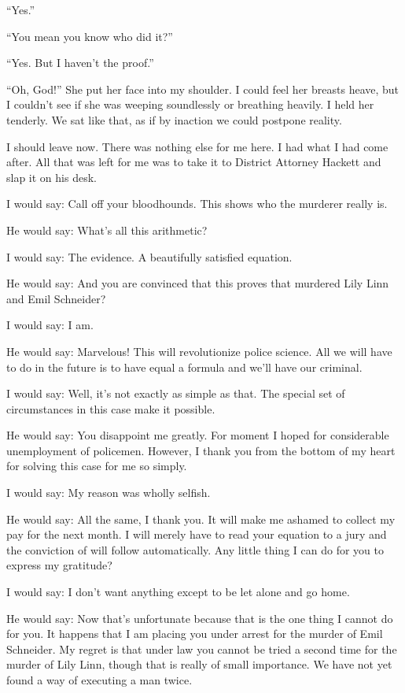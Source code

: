 \documentclass{novel}
\begin{document}
“Yes.”

“You mean you know who did it?”

“Yes. But I haven’t the proof.”

“Oh, God!” She put her face into my shoulder. I could feel her breasts heave, but I couldn’t see if she was weeping soundlessly or breathing heavily. I held her tenderly. We sat like that, as if by inaction we could postpone reality.

\scenestars

I should leave now. There was nothing else for me here. I had what I had come after. All that was left for me was to take it to District Attorney Hackett and slap it on his desk.

I would say: Call off your bloodhounds. This shows who the murderer really is.

He would say: What’s all this arithmetic?

I would say: The evidence. A beautifully satisfied equation.

He would say: And you are convinced that this proves that  murdered Lily Linn and Emil Schneider?

I would say: I am.

He would say: Marvelous! This will revolutionize police science. All we will have to do in the future is to have  equal a formula and we’ll have our criminal.

I would say: Well, it’s not exactly as simple as that. The special set of circumstances in this case make it possible.

He would say: You disappoint me greatly. For moment I hoped for considerable unemployment of policemen. However, I thank you from the bottom of my heart for solving this case for me so simply.

I would say: My reason was wholly selfish.

He would say: All the same, I thank you. It will make me ashamed to collect my pay for the next month. I will merely have to read your equation to a jury and the conviction of  will follow automatically. Any little thing I can do for you to express my gratitude?

I would say: I don’t want anything except to be let alone and go home.

He would say: Now that’s unfortunate because that is the one thing I cannot do for you. It happens that I am placing you under arrest for the murder of Emil Schneider. My regret is that under law you cannot be tried a second time for the murder of Lily Linn, though that is really of small importance. We have not yet found a way of executing a man twice.
\end{document}
